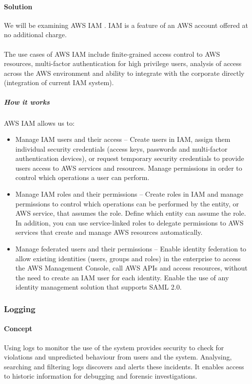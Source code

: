 \documentclass[10pt]{article}
\begin{document}
\paragraph{Solution}
We will be examining AWS IAM \cite{aws-iam}. IAM is a feature of an AWS account offered at no additional charge. 
\\ \\
The use cases of AWS IAM include finite-grained access control to AWS resources, multi-factor authentication for high privilege users, analysis of access across the AWS environment and ability to integrate with the corporate directly (integration of current IAM system). 
\subparagraph{How it works}
AWS IAM allows us to:
\begin{itemize}
    \item Manage IAM users and their access –  Create users in IAM, assign them individual security credentials (access keys, passwords and multi-factor authentication devices), or request temporary security credentials to provide users access to AWS services and resources. Manage permissions in order to control which operations a user can perform.
    \item Manage IAM roles and their permissions – Create roles in IAM and manage permissions to control which operations can be performed by the entity, or AWS service, that assumes the role. Define which entity can assume the role. In addition, you can use service-linked roles to delegate permissions to AWS services that create and manage AWS resources automatically.
    \item Manage federated users and their permissions – Enable identity federation to allow existing identities (users, groups and roles) in the enterprise to access the AWS Management Console, call AWS APIs and access resources, without the need to create an IAM user for each identity. Enable the use of any identity management solution that supports SAML 2.0.
\end{itemize}

\newpage
\subsubsection{Logging}
\paragraph{Concept}
Using logs to monitor the use of the system provides security to check for violations and unpredicted behaviour from users and the system. Analysing, searching and filtering logs discovers and alerts these incidents. It enables access to historic information for debugging and forensic investigations. \cite{logs}
\end{document}
